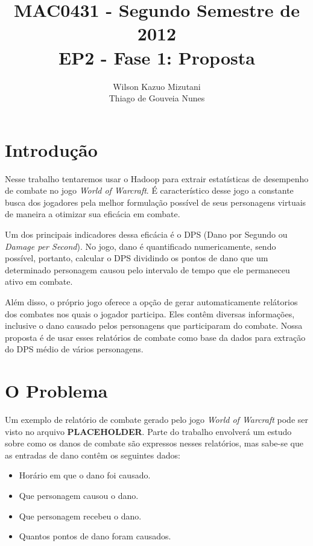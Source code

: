 \documentclass[a4paper,11pt]{article}
\title{MAC0431 - Segundo Semestre de 2012 \\
       EP2 - Fase 1: Proposta}
\author{Wilson Kazuo Mizutani \\ Thiago de Gouveia Nunes}
\begin{document}
\maketitle

\section{Introdução}

  Nesse trabalho tentaremos usar o Hadoop para extrair estatísticas de
  desempenho de combate no jogo \textit{World of Warcraft}. É característico
  desse jogo a constante busca dos jogadores pela melhor formulação possível de
  seus personagens virtuais de maneira a otimizar sua eficácia em combate.
  
  Um dos principais indicadores dessa eficácia é o DPS (Dano por Segundo ou
  \textit{Damage per Second}). No jogo, dano é quantificado numericamente, sendo
  possível, portanto, calcular o DPS dividindo os pontos de dano que um
  determinado personagem causou pelo intervalo de tempo que ele permaneceu ativo
  em combate.
  
  Além disso, o próprio jogo oferece a opção de gerar automaticamente relátorios
  dos combates nos quais o jogador participa. Eles contêm diversas informações,
  inclusive o dano causado pelos personagens que participaram do combate.
  Nossa proposta é de usar esses relatórios de combate como base da dados para
  extração do DPS médio de vários personagens.

\section{O Problema}

  Um exemplo de relatório de combate gerado pelo jogo \textit{World of Warcraft}
  pode ser visto no arquivo \textbf{\LARGE{PLACEHOLDER}}. Parte do trabalho
  envolverá um estudo sobre como os danos de combate são expressos nesses
  relatórios, mas sabe-se que as entradas de dano contêm os seguintes dados:
  
  \begin{itemize}
  
    \item Horário em que o dano foi causado.
    \item Que personagem causou o dano.
    \item Que personagem recebeu o dano.
    \item Quantos pontos de dano foram causados.
  
  \end{itemize}
  
\end{document}
